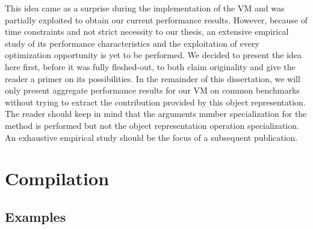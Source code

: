 This idea came as a surprise during the implementation of the VM and was
partially exploited to obtain our current performance results. However, because
of time constraints and not strict necessity to our thesis, an extensive
empirical study of its performance characteristics and the exploitation of
every optimization opportunity is yet to be performed. We decided to present
the idea here first, before it was fully fleshed-out, to both claim originality
and give the reader a primer on its possibilities. In the remainder of this
dissertation, we will only present aggregate performance results for our VM on
common benchmarks without trying to extract the contribution provided by this
object representation. The reader should keep in mind that the arguments number
specialization for the  method is performed but not the object
representation operation specialization. An exhaustive empirical study should
be the focus of a subsequent publication.

\section{Compilation}
\subsection{Examples}

